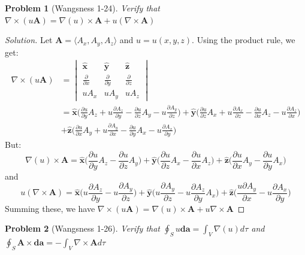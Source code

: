 \documentclass{article}
\theoremstyle{mystyle}
\newtheorem{problem}{Problem}[section]
\begin{document}
\begin{problem}[Wangsness 1-24]
Verify that $\nabla \times (u\mathbf{A}) = \nabla(u)\times \mathbf{A}+u(\nabla \times \mathbf{A})$
\end{problem}
\begin{proof}[Solution]
Let $\mathbf{A} = \langle A_x,A_y,A_z\rangle$ and $u = u(x,y,z)$. Using the product rule, we get:
\begin{align*}
    \nabla \times (u\mathbf{A}) &= \begin{vmatrix} \hat{\mathbf{x}} & \hat{\mathbf{y}} & \hat{\mathbf{z}} \\ \frac{\partial}{\partial x} & \frac{\partial}{\partial y} & \frac{\partial}{\partial z} \\ uA_x & uA_y & uA_z \end{vmatrix}\\
    &= \hat{\mathbf{x}}\big( \frac{\partial u}{\partial y} A_z + u \frac{\partial A_z}{\partial y}-\frac{\partial u}{\partial z}A_y -u \frac{\partial A_y}{\partial z}\big) + \hat{\mathbf{y}}\big(\frac{\partial u}{\partial z} A_x + u \frac{\partial A_x}{\partial z} - \frac{\partial u}{\partial x} A_z - u\frac{\partial A_z}{\partial x}\big)\\ &+ \hat{\mathbf{z}}\big(\frac{\partial u}{\partial x}A_y + u \frac{\partial A_y}{\partial x} - \frac{\partial u}{\partial y}A_x - u\frac{\partial A_x}{\partial y}\big)   
\end{align*}
%
But:
\begin{equation*}
    \nabla(u)\times \mathbf{A} = \hat{\mathbf{x}}\big(\frac{\partial u}{\partial y}A_z - \frac{\partial u}{\partial z}A_y\big) + \hat{\mathbf{y}}\big(\frac{\partial u}{\partial z}A_x - \frac{\partial u}{\partial x}A_z\big) + \hat{\mathbf{z}}\big(\frac{\partial u}{\partial x}A_y - \frac{\partial u}{\partial y}A_x\big)
\end{equation*}
%
and
%
\begin{equation*}
    u(\nabla \times \mathbf{A}) = \hat{\mathbf{x}}\big(u\frac{\partial A_z}{\partial y} - u\frac{\partial A_y}{\partial z}\big) + \hat{\mathbf{y}}\big(u\frac{\partial A_y}{\partial z} -u\frac{\partial A_z}{\partial y}A_x\big) + \hat{\mathbf{z}}\big(\frac{u\partial A_y}{\partial x}-u\frac{\partial A_x}{\partial y}\big)   
\end{equation*}
%
Summing these, we have $\nabla \times (u\mathbf{A}) =\nabla(u)\times \mathbf{A}+u\nabla \times \mathbf{A}$
\end{proof}
%
\begin{problem}[Wangsness 1-26]
Verify that $\oint_{S} u\boldsymbol{da}= \int_{V} \nabla(u)d\tau$ and $\oint_{S} \mathbf{A}\times \boldsymbol{da}= -\int_{V} \nabla \times \mathbf{A} d\tau$
\end{problem}
\end{document}
